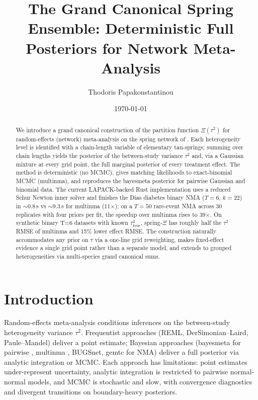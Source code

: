 \documentclass[12pt]{article}
\title{The Grand Canonical Spring Ensemble: Deterministic Full Posteriors for Network Meta-Analysis}
\author{Thodoris Papakonstantinou}
\date{\today}
\begin{document}
\maketitle

\begin{abstract}
We introduce a grand canonical construction of the partition function
$\Xi(\tau^2)$ for random-effects (network) meta-analysis on the spring
network of \citet{papakonstantinou2025spring}. Each heterogeneity level
is identified with a chain-length variable of elementary tau-springs;
summing over chain lengths yields the posterior of the between-study
variance $\tau^2$ and, via a Gaussian mixture at every grid point, the
full marginal posterior of every treatment effect. The method is
deterministic (no MCMC), gives matching likelihoods to exact-binomial
MCMC (multinma), and reproduces the bayesmeta posterior for pairwise
Gaussian and binomial data. The current LAPACK-backed Rust
implementation uses a reduced Schur Newton inner solver and finishes
the Dias diabetes binary NMA ($T=6$, $k=22$) in $\sim$0.8\,s vs
$\sim$9.3\,s for multinma (11$\times$); on a $T=50$ rare-event NMA
across 30 replicates with four priors per fit, the speedup over
multinma rises to 39$\times$. On synthetic binary T=6 datasets with
known $\tau^2_{\text{true}}$, spring-$\Xi$ has roughly half the
$\tau^2$ RMSE of multinma and 15\% lower effect RMSE. The construction naturally accommodates any prior on
$\tau$ via a one-line grid reweighting, makes fixed-effect evidence a
single grid point rather than a separate model, and extends to grouped
heterogeneities via multi-species grand canonical sums.
\end{abstract}

\section{Introduction}

Random-effects meta-analysis conditions inferences on the between-study
heterogeneity variance $\tau^2$. Frequentist approaches (REML, DerSimonian--Laird, Paule--Mandel) deliver a point estimate; Bayesian
approaches (bayesmeta for pairwise \citep{rover2020bayesmeta},
multinma \citep{phillippo2023multinma}, BUGSnet, gemtc for NMA) deliver
a full posterior via analytic integration or MCMC. Each approach has
limitations: point estimates under-represent uncertainty, analytic
integration is restricted to pairwise normal-normal models, and MCMC is
stochastic and slow, with convergence diagnostics and divergent
transitions on boundary-heavy posteriors.
\end{document}
